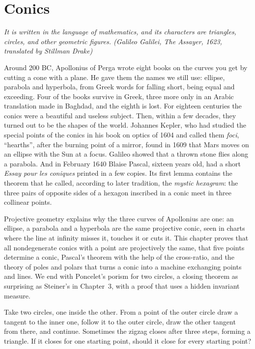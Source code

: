 \chapter{Conics}\label{ch:conics}

\begin{center}\itshape
It is written in the language of mathematics, and its characters are triangles, circles, and other geometric figures.
\upshape(Galileo Galilei, \emph{The Assayer}, 1623, translated by Stillman Drake)
\end{center}

Around 200 BC, Apollonius of Perga wrote eight books on the curves you get by cutting a cone with a plane. He gave them the names we
still use: ellipse, parabola and hyperbola, from Greek words for falling short, being equal and exceeding. Four of the books survive in Greek,
three more only in an Arabic translation made in Baghdad, and the eighth is lost. For eighteen centuries the conics were a beautiful and
useless subject. Then, within a few decades, they turned out to be the shapes of the world. Johannes Kepler, who had studied the special points of
the conics in his book on optics of 1604 and called them \emph{foci}, ``hearths'', after the burning point of a mirror, found in 1609 that Mars moves
on an ellipse with the Sun at a focus. Galileo showed that a thrown stone flies along a parabola. And in February 1640 Blaise Pascal, sixteen years old,
had a short \emph{Essay pour les coniques} printed in a few copies. Its first lemma contains the theorem that he called, according to later
tradition, the \emph{mystic hexagram}: the three pairs of opposite sides of a hexagon inscribed in a conic meet in three collinear points.

Projective geometry explains why the three curves of Apollonius are one: an ellipse, a parabola and a hyperbola are the same projective conic,
seen in charts where the line at infinity misses it, touches it or cuts it. This chapter proves that all nondegenerate conics with a point are
projectively the same, that five points determine a conic, Pascal's theorem with the help of the cross-ratio, and the theory of poles and polars
that turns a conic into a machine exchanging points and lines. We end with Poncelet's porism for two circles, a closing theorem as surprising
as Steiner's in Chapter~3, with a proof that uses a hidden invariant measure.

\begin{think}
Take two circles, one inside the other. From a point of the outer circle draw a tangent to the inner one, follow it to the outer circle, draw the
other tangent from there, and continue. Sometimes the zigzag closes after three steps, forming a triangle. If it closes for one starting point,
should it close for every starting point?
\end{think}

